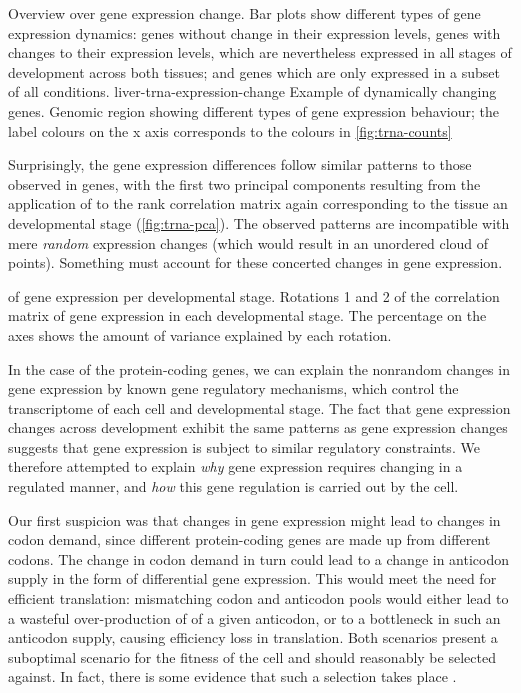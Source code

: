     {Overview over \trna gene expression change.}
    {Bar plots show different types of \trna gene expression dynamics: \trna
    genes without change in their expression levels, \trna genes with changes to
    their expression levels, which are nevertheless expressed in all stages of
    development across both tissues; and \trna genes which are only expressed in
    a subset of all conditions.}
    {liver-trna-expression-change}
    {Example of dynamically changing \trna genes.}
    {Genomic region showing different types of \trna gene expression behaviour;
    the label colours on the x axis corresponds to the colours in
    \cref{fig:trna-counts}}

Surprisingly, the \trna gene expression differences follow similar patterns to
those observed in \mrna genes, with the first two principal components resulting
from the application of \pca to the rank correlation matrix again corresponding
to the tissue an developmental stage (\cref{fig:trna-pca}). The observed
patterns are incompatible with mere \emph{random} expression changes (which
would result in an unordered cloud of points). Something must account for these
concerted changes in \trna gene expression.

    {\pca of \trna gene expression per developmental stage.}
    {Rotations \num{1} and \num{2} of the correlation matrix of
    \trna gene expression in each developmental stage. The percentage on the
    axes shows the amount of variance explained by each rotation.}

In the case of the protein-coding genes, we can explain the nonrandom changes in
gene expression by known gene regulatory mechanisms, which control the
transcriptome of each cell and developmental stage. The fact that \trna gene
expression changes across development exhibit the same patterns as \mrna gene
expression changes suggests that \trna gene expression is subject to similar
regulatory constraints. We therefore attempted to explain \emph{why} \trna gene
expression requires changing in a regulated manner, and \emph{how} this \trna
gene regulation is carried out by the cell.

Our first suspicion was that changes in \mrna gene expression might lead to
changes in codon demand, since different protein-coding genes are made up from
different codons. The change in codon demand in turn could lead to a change in
anticodon supply in the form of differential \trna gene expression. This would
meet the need for efficient translation: mismatching codon and anticodon pools
would either lead to a wasteful over-production of \trna[s] of a given
anticodon, or to a bottleneck in such an anticodon supply, causing efficiency
loss in translation. Both scenarios present a suboptimal scenario for the
fitness of the cell and should reasonably be selected against. In fact, there is
some evidence that such a selection takes place
\citep{Ikemura:1981,Ikemura:1985,Yang:2008}.


